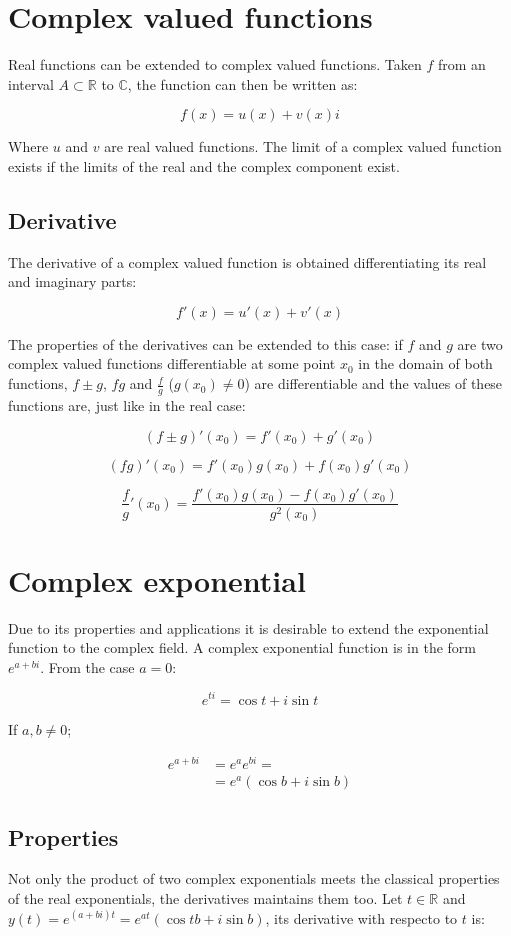 \section{Complex valued functions}
Real functions can be extended to complex valued functions.
Taken $f$ from an interval $A\subset\mathbb{R}$ to $\mathbb{C}$, the function can then be written as:

$$f(x) = u(x) + v(x)i$$

Where $u$ and $v$ are real valued functions.
The limit of a complex valued function exists if the limits of the real and the complex component exist.

	\subsection{Derivative}
	The derivative of a complex valued function is obtained differentiating its real and imaginary parts:

	$$f'(x) = u'(x) + v'(x)$$

	The properties of the derivatives can be extended to this case: if $f$ and $g$ are two complex valued functions differentiable at some point $x_0$ in the domain of both functions, $f\pm g$, $fg$ and $\frac{f}{g}$ ($g(x_0)\neq 0$) are differentiable and the values of these functions are, just like in the real case:

	$$(f\pm g)'(x_0) = f'(x_0) + g'(x_0)$$

	$$(fg)'(x_0) = f'(x_0)g(x_0) + f(x_0)g'(x_0)$$

	$$\frac{f}{g}'(x_0) = \frac{f'(x_0)g(x_0)-f(x_0)g'(x_0)}{g^2(x_0)}$$

\section{Complex exponential}
Due to its properties and applications it is desirable to extend the exponential function to the complex field.
A complex exponential function is in the form $e^{a+bi}$.
From the case $a = 0$:

$$e^{ti} = \cos t + i\sin t$$

If $a, b\neq 0$;

\begin{align*}
	e^{a+bi} &= e^ae^{bi} =\\
					 &=e^a(\cos b + i\sin b)
\end{align*}

	\subsection{Properties}
	Not only the product of two complex exponentials meets the classical properties of the real exponentials, the derivatives maintains them too.
	Let $t\in\mathbb{R}$ and $y(t) = e^{(a+bi)t} = e^{at}(\cos t b + i\sin b)$, its derivative with respecto to $t$ is:

